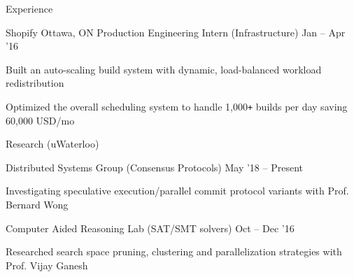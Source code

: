 \documentclass{resume} %
\begin{document}
\begin{rSection}{Experience}
  \begin{rWorkSection}{Shopify}
                     {Ottawa, ON}
                     {Production Engineering Intern (Infrastructure)}
                     {Jan -- Apr '16}
  \item Built an auto-scaling build system with dynamic, load-balanced
    workload redistribution
  \item Optimized the overall scheduling system to handle 1,000\texttt{+}
    builds per day saving 60,000 USD/mo
  \end{rWorkSection}
\end{rSection}


\begin{rSection}{Research (uWaterloo)}
  \begin{rResearchSection}{Distributed Systems Group}
                     {(Consensus Protocols)}
                     {May '18 -- Present}
    \item Investigating speculative execution/parallel commit protocol variants
      with Prof. Bernard Wong
  \end{rResearchSection}
  \begin{rResearchSection}{Computer Aided Reasoning Lab}
                     {(SAT/SMT solvers)}
                     {Oct -- Dec '16}
   \item Researched search space pruning, clustering and
     parallelization strategies with Prof. Vijay Ganesh
  \end{rResearchSection}
\end{rSection}

\end{document}
